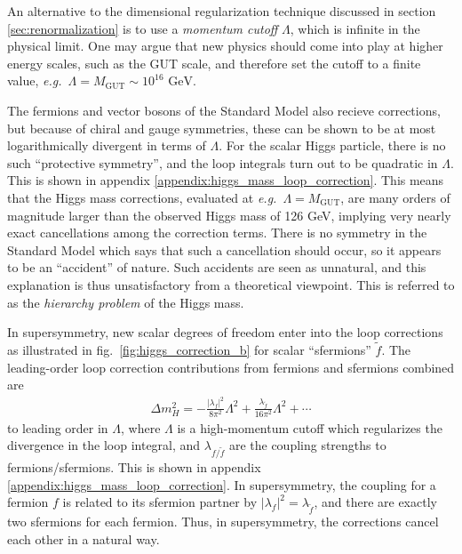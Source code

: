 \documentclass[twoside,english]{uiofysmaster}
\begin{document}
An alternative to the dimensional regularization technique discussed in section \ref{sec:renormalization} is to use a {\it momentum cutoff} $\Lambda$, which is infinite in the physical limit. One may argue that new physics should come into play at higher energy scales, such as the GUT scale, and therefore set the cutoff to a finite value, {\it e.g.}\ $\Lambda = M_{\mathrm{GUT}} \sim 10^{16}\,\,\mathrm{GeV}$.

The fermions and vector bosons of the Standard Model also recieve corrections, but because of chiral and gauge symmetries, these can be shown to be at most logarithmically divergent in terms of $\Lambda$. For the scalar Higgs particle, there is no such ``protective symmetry'', and the loop integrals turn out to be quadratic in $\Lambda$. This is shown in appendix \ref{appendix:higgs_mass_loop_correction}. This means that the Higgs mass corrections, evaluated at {\it e.g.}\ $\Lambda = M_{\mathrm{GUT}}$, are many orders of magnitude larger than the observed Higgs mass of 126 GeV, implying very nearly exact cancellations among the correction terms. There is no symmetry in the Standard Model which says that such a cancellation should occur, so it appears to be an ``accident'' of nature. Such accidents are seen as unnatural, and this explanation is thus unsatisfactory from a theoretical viewpoint. This is referred to as the {\it hierarchy problem} of the Higgs mass. 

In supersymmetry, new scalar degrees of freedom enter into the loop corrections as illustrated in fig.\ \ref{fig:higgs_correction_b} for scalar ``sfermions'' $\tilde f$. The leading-order loop correction contributions from fermions and sfermions combined are 
\begin{align}
	\Delta m_H^2 = -\frac{|\lambda_f|^2}{8\pi^2}\Lambda^2 + \frac{\lambda_{\tilde f}}{16\pi^2}\Lambda^2 + \cdots\label{eq:higgs_mass_corrections}
\end{align}
to leading order in $\Lambda$, where $\Lambda$ is a high-momentum cutoff which regularizes the divergence in the loop integral, and $\lambda_{f/\tilde f}$ are the coupling strengths to fermions/sfermions. This is shown in appendix \ref{appendix:higgs_mass_loop_correction}. In supersymmetry, the coupling for a fermion $f$ is related to its sfermion partner by $|\lambda_f|^2 = \lambda_{\tilde f}$, and there are exactly two sfermions for each fermion. Thus, in supersymmetry, the corrections cancel each other in a natural way.
\end{document}
